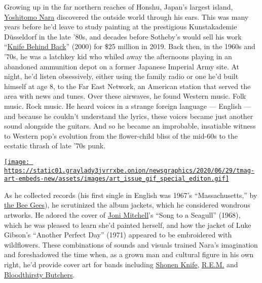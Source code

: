 Growing up in the far northern reaches of Honshu, Japan's largest
island,
\href{https://www.pacegallery.com/artists/yoshitomo-nara/}{Yoshitomo
Nara} discovered the outside world through his ears. This was many years
before he'd leave to study painting at the prestigious Kunstakademie
Düsseldorf in the late '80s, and decades before Sotheby's would sell his
work
``\href{https://www.sothebys.com/en/auctions/ecatalogue/2019/contemporary-art-evening-sale-hk0885/lot.1142.html}{Knife
Behind Back}'' (2000) for \$25 million in 2019. Back then, in the 1960s
and '70s, he was a latchkey kid who whiled away the afternoons playing
in an abandoned ammunition depot on a former Japanese Imperial Army
site. At night, he'd listen obsessively, either using the family radio
or one he'd built himself at age 8, to the Far East Network, an American
station that served the area with news and tunes. Over these airwaves,
he found Western music. Folk music. Rock music. He heard voices in a
strange foreign language --- English --- and because he couldn't
understand the lyrics, these voices became just another sound alongside
the guitars. And so he became an improbable, insatiable witness to
Western pop's evolution from the flower-child bliss of the mid-60s to
the ecstatic thrash of late '70s punk.

\href{https://www.nytimes3xbfgragh.onion/issue/t-magazine/2020/07/02/true-believers-art-issue}{\texttt{[image: https://static01.graylady3jvrrxbe.onion/newsgraphics/2020/06/29/tmag-art-embeds-new/assets/images/art\_issue\_gif\_special\_editon.gif]}}

As he collected records (his first single in English was 1967's
``Massachusetts,'' by
\href{https://www.nytimes3xbfgragh.onion/1979/02/18/archives/why-the-bee-gees-sound-so-good-the-bee-gees.html}{the
Bee Gees}), he scrutinized the album jackets, which he considered
wondrous artworks. He adored the cover of
\href{https://www.nytimes3xbfgragh.onion/topic/person/joni-mitchell}{Joni
Mitchell}'s ``Song to a Seagull'' (1968), which he was pleased to learn
she'd painted herself, and how the jacket of Luke Gibson's ``Another
Perfect Day'' (1971) appeared to be embroidered with wildflowers. These
combinations of sounds and visuals trained Nara's imagination and
foreshadowed the time when, as a grown man and cultural figure in his
own right, he'd provide cover art for bands including
\href{https://www.moma.org/collection/works/88514}{Shonen Knife},
\href{https://en.wikipedia.org/wiki/I\%27ll_Take_the_Rain\#/media/File:R.E.M._-_I'll_Take_the_Rain.jpg}{R.E.M.}
and
\href{https://en.wikipedia.org/wiki/Bloodthirsty_butchers_vs_\%2B/-_PLUS/MINUS\#/media/File:Butcherssplit.jpg}{Bloodthirsty
Butchers}.

